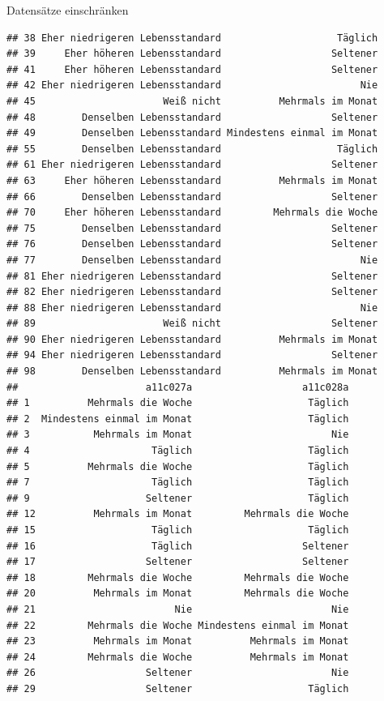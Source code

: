 \documentclass[ignorenonframetext,]{beamer}
\begin{document}
\begin{frame}[fragile]{Datensätze einschränken}
\begin{verbatim}
## 38 Eher niedrigeren Lebensstandard                    Täglich
## 39     Eher höheren Lebensstandard                   Seltener
## 41     Eher höheren Lebensstandard                   Seltener
## 42 Eher niedrigeren Lebensstandard                        Nie
## 45                      Weiß nicht          Mehrmals im Monat
## 48        Denselben Lebensstandard                   Seltener
## 49        Denselben Lebensstandard Mindestens einmal im Monat
## 55        Denselben Lebensstandard                    Täglich
## 61 Eher niedrigeren Lebensstandard                   Seltener
## 63     Eher höheren Lebensstandard          Mehrmals im Monat
## 66        Denselben Lebensstandard                   Seltener
## 70     Eher höheren Lebensstandard         Mehrmals die Woche
## 75        Denselben Lebensstandard                   Seltener
## 76        Denselben Lebensstandard                   Seltener
## 77        Denselben Lebensstandard                        Nie
## 81 Eher niedrigeren Lebensstandard                   Seltener
## 82 Eher niedrigeren Lebensstandard                   Seltener
## 88 Eher niedrigeren Lebensstandard                        Nie
## 89                      Weiß nicht                   Seltener
## 90 Eher niedrigeren Lebensstandard          Mehrmals im Monat
## 94 Eher niedrigeren Lebensstandard                   Seltener
## 98        Denselben Lebensstandard          Mehrmals im Monat
##                      a11c027a                   a11c028a
## 1          Mehrmals die Woche                    Täglich
## 2  Mindestens einmal im Monat                    Täglich
## 3           Mehrmals im Monat                        Nie
## 4                     Täglich                    Täglich
## 5          Mehrmals die Woche                    Täglich
## 7                     Täglich                    Täglich
## 9                    Seltener                    Täglich
## 12          Mehrmals im Monat         Mehrmals die Woche
## 15                    Täglich                    Täglich
## 16                    Täglich                   Seltener
## 17                   Seltener                   Seltener
## 18         Mehrmals die Woche         Mehrmals die Woche
## 20          Mehrmals im Monat         Mehrmals die Woche
## 21                        Nie                        Nie
## 22         Mehrmals die Woche Mindestens einmal im Monat
## 23          Mehrmals im Monat          Mehrmals im Monat
## 24         Mehrmals die Woche          Mehrmals im Monat
## 26                   Seltener                        Nie
## 29                   Seltener                    Täglich

\end{verbatim}
\end{frame}
\end{document}
